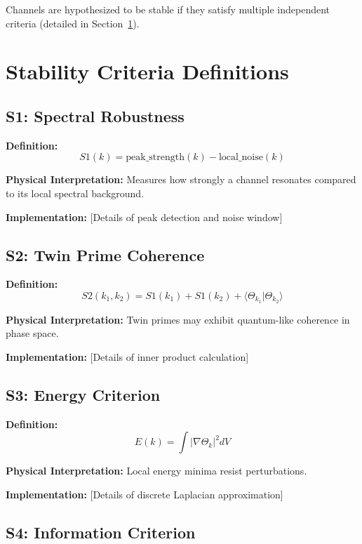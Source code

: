 \documentclass[11pt,a4paper]{article}
\begin{document}
Channels are hypothesized to be stable if they satisfy multiple independent criteria (detailed in Section~\ref{sec:criteria}).

\section{Stability Criteria Definitions}
\label{sec:criteria}

\subsection{S1: Spectral Robustness}

\textbf{Definition:}
\begin{equation}
S1(k) = \text{peak\_strength}(k) - \text{local\_noise}(k)
\end{equation}

\textbf{Physical Interpretation:} Measures how strongly a channel resonates compared to its local spectral background.

\textbf{Implementation:} [Details of peak detection and noise window]

\subsection{S2: Twin Prime Coherence}

\textbf{Definition:}
\begin{equation}
S2(k_1, k_2) = S1(k_1) + S1(k_2) + \langle \Theta_{k_1} | \Theta_{k_2} \rangle
\end{equation}

\textbf{Physical Interpretation:} Twin primes may exhibit quantum-like coherence in phase space.

\textbf{Implementation:} [Details of inner product calculation]

\subsection{S3: Energy Criterion}

\textbf{Definition:}
\begin{equation}
E(k) = \int |\nabla \Theta_k|^2 dV
\end{equation}

\textbf{Physical Interpretation:} Local energy minima resist perturbations.

\textbf{Implementation:} [Details of discrete Laplacian approximation]

\subsection{S4: Information Criterion}
\end{document}
